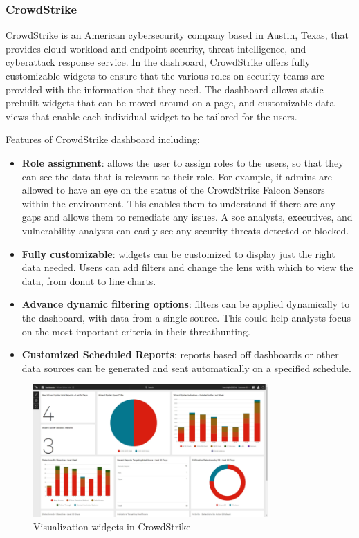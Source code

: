 \subsubsection{CrowdStrike}

CrowdStrike is an American cybersecurity company based in Austin, Texas, that provides cloud workload and
endpoint security, threat intelligence, and cyberattack response service. In the dashboard, CrowdStrike
offers fully customizable widgets to ensure that the various roles on security teams are provided with
the information that they need. The dashboard allows static prebuilt widgets that can be moved around on
a page, and customizable data views that enable each individual widget to be tailored for the users.

Features of CrowdStrike dashboard including:

\begin{itemize}
      \item \textbf{Role assignment}: allows the user to assign roles to the users, so that they can see
            the data that is relevant to their role. For example, \acrshort{it} admins are allowed to have
            an eye on the status of the CrowdStrike Falcon Sensors within the environment. This enables them
            to  understand if there are any gaps and allows them to remediate any issues. A \acrshort{soc}
            analysts, executives, and vulnerability analysts can easily see any security threats detected
            or blocked.
      \item \textbf{Fully customizable}: widgets can be customized to display just the right data needed.
            Users can add filters and change the lens with which to view the data, from donut to line charts.
      \item \textbf{Advance dynamic filtering options}: filters can be applied dynamically to the dashboard,
            with data from a single source. This could help analysts focus on the most important criteria
            in their \gls{threathunting}.
      \item \textbf{Customized Scheduled Reports}: reports based off dashboards or other data sources can
            be generated and sent automatically on a specified schedule.
\end{itemize}

\begin{figure}[htbp]
      \centering
      \includegraphics[width=0.8\textwidth]{Figures/CrowdStrike/visualization-widgets.png}
      \caption{Visualization widgets in CrowdStrike}
\end{figure}

